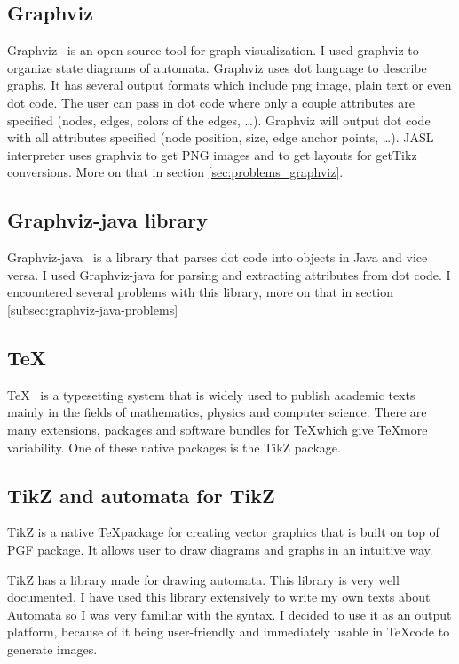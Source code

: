 \documentclass{ctuthesis}
\begin{document}
\subsection{Graphviz}

Graphviz~\cite{graphviz} is an open source tool for graph visualization. I used graphviz to organize state diagrams of automata. Graphviz uses dot language to describe graphs. It has several output formats which include png image, plain text or even dot code. The user can pass in dot code where only a couple attributes are specified (nodes, edges, colors of the edges, \ldots). Graphviz will output dot code with all attributes specified (node position, size, edge anchor points, \ldots).  JASL interpreter uses graphviz to get PNG images and to get layouts for getTikz conversions. More on that in section \ref{sec:problems_graphviz}.

\subsection{Graphviz-java library}
Graphviz-java~\cite{graphviz-java} is a library that parses dot code into objects in Java and vice versa. I used Graphviz-java for parsing and extracting attributes from dot code. I encountered several problems with this library, more on that in section \ref{subsec:graphviz-java-problems}

\subsection{\TeX}
\TeX~\cite{tex} is a typesetting system that is widely used to publish academic texts mainly in the fields of mathematics, physics and computer science. There are many extensions, packages and software bundles for \TeX which give \TeX more variability. One of these native packages is the TikZ package.

\subsection{TikZ and automata for TikZ}
TikZ is a native \TeX package for creating vector graphics that is built on top of PGF package. It allows user to draw diagrams and graphs in an intuitive way.

TikZ has a library made for drawing automata. This library is very well documented. I have used this library extensively to write my own texts about Automata so I was very familiar with the syntax. I decided to use it as an output platform, because of it being user-friendly and immediately usable in \TeX code to generate images.
\end{document}
